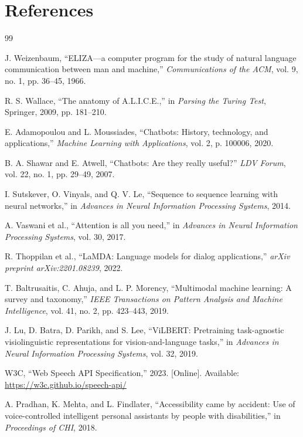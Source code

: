 \documentclass[conference]{IEEEtran}
\begin{document}
\section*{References}
\begin{thebibliography}{99}

J. Weizenbaum, ``ELIZA---a computer program for the study of natural language communication between man and machine,'' \textit{Communications of the ACM}, vol. 9, no. 1, pp. 36--45, 1966.

R. S. Wallace, ``The anatomy of A.L.I.C.E.,'' in \textit{Parsing the Turing Test}, Springer, 2009, pp. 181--210.

E. Adamopoulou and L. Moussiades, ``Chatbots: History, technology, and applications,'' \textit{Machine Learning with Applications}, vol. 2, p. 100006, 2020.

B. A. Shawar and E. Atwell, ``Chatbots: Are they really useful?'' \textit{LDV Forum}, vol. 22, no. 1, pp. 29--49, 2007.

I. Sutskever, O. Vinyals, and Q. V. Le, ``Sequence to sequence learning with neural networks,'' in \textit{Advances in Neural Information Processing Systems}, 2014.

A. Vaswani et al., ``Attention is all you need,'' in \textit{Advances in Neural Information Processing Systems}, vol. 30, 2017.

R. Thoppilan et al., ``LaMDA: Language models for dialog applications,'' \textit{arXiv preprint arXiv:2201.08239}, 2022.

T. Baltrusaitis, C. Ahuja, and L. P. Morency, ``Multimodal machine learning: A survey and taxonomy,'' \textit{IEEE Transactions on Pattern Analysis and Machine Intelligence}, vol. 41, no. 2, pp. 423--443, 2019.

J. Lu, D. Batra, D. Parikh, and S. Lee, ``ViLBERT: Pretraining task-agnostic visiolinguistic representations for vision-and-language tasks,'' in \textit{Advances in Neural Information Processing Systems}, vol. 32, 2019.

W3C, ``Web Speech API Specification,'' 2023. [Online]. Available: \url{https://w3c.github.io/speech-api/}

A. Pradhan, K. Mehta, and L. Findlater, ``Accessibility came by accident: Use of voice-controlled intelligent personal assistants by people with disabilities,'' in \textit{Proceedings of CHI}, 2018.


\end{thebibliography}
\end{document}
